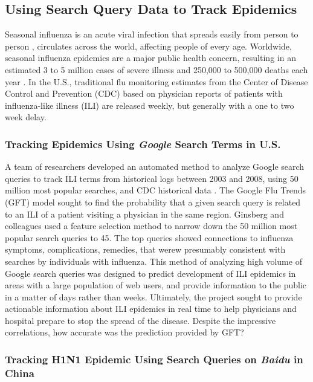 \documentclass[sigconf]{acmart}
\begin{document}
\subsection{Using Search Query Data to Track Epidemics}

Seasonal influenza is an acute viral infection that spreads easily from person to person , circulates across the world, affecting people of every age. Worldwide, seasonal influenza epidemics are a major public health concern, resulting in an estimated 3 to 5 million cases of severe illness and 250,000 to 500,000 deaths each year \cite{who16}. In the U.S., traditional flu monitoring estimates from the Center of Disease Control and Prevention (CDC) based on physician reports of patients with influenza-like illness (ILI) are released weekly, but generally with a one to two week delay.

\subsubsection{Tracking Epidemics Using {\itshape Google} Search Terms in U.S.}

A team of researchers developed an automated method to analyze Google search queries to track ILI terms from historical logs between 2003 and 2008, using 50 million most popular searches, and CDC historical data \cite{ginsberg09}. The Google Flu Trends (GFT) model sought to find the probability that a given search query is related to an ILI of a patient visiting a physician in the same region. Ginsberg and colleagues used a feature selection method to narrow down the 50 million most popular search queries to 45. The top queries showed connections to influenza symptoms, complications, remedies, that werew presumably consistent with searches by individuals with influenza. This method of analyzing high volume of Google search queries was designed to predict development of ILI epidemics in areas with a large population of web users, and provide information to the public in a matter of days rather than weeks. Ultimately, the project sought to provide actionable information about ILI epidemics in real time to help physicians and hospital prepare to stop the spread of the disease. Despite the impressive correlations, 
how accurate was the prediction provided by GFT?




\subsubsection{Tracking H1N1 Epidemic Using Search Queries on {\itshape Baidu} in China }
\end{document}
